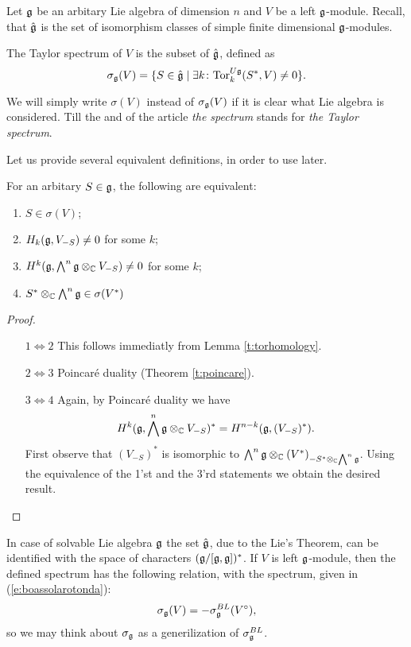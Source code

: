 Let $\mathfrak{g}$ be an arbitary Lie algebra of dimension $n$ and $V$ be a left $\mathfrak{g}$-module.  Recall, that $\hat{\mathfrak{g}}$
is the set of isomorphism classes of simple finite dimensional $\mathfrak{g}$-modules.
\begin{definition}
    The Taylor spectrum of $V$ is the subset of $\hat{\mathfrak{g}}$, defined as
    \[
        \sigma_{\mathfrak{g}}(V)=\{ S\in \hat{\mathfrak{g}} \mid \exists 
            k \colon \mathrm{Tor}^{U\mathfrak{g}}_k(S^*,V)\neq 0\}.
    \]
\end{definition}
We will simply write $\sigma(V)$ instead of $\sigma_{\mathfrak{g}}(V)$ if it is clear what Lie algebra is
considered. Till the and of the article \emph{the spectrum} stands for \emph{the Taylor spectrum}.

Let us provide several equivalent definitions, in order to use later.
\begin{lemma} \label{l:definitions}
   For an arbitary $S\in\mathfrak{g}$, the following are equivalent:
   \begin{enumerate}
       \item $S \in \sigma(V)$; 
           
       \item $H_k(\mathfrak{g}, V_{-S}) \ne 0$ for some $k$; 

       \item $H^k(\mathfrak{g}, \bigwedge^n\mathfrak{g}\otimes_{\mathbb{C}} V_{-S}) \ne 0$ for some $k$;

       \item $S^* \otimes_{\mathbb{C}} \bigwedge^n\mathfrak{g} \in \sigma(V^*)$
   \end{enumerate}
\end{lemma}
\begin{proof}
    \begin{itemize}
        \item[$1 \Leftrightarrow 2$]
            This follows immediatly from Lemma \ref{t:torhomology}.

        \item[$2 \Leftrightarrow 3$]
            Poincar\'e duality (Theorem \ref{t:poincare}).

        \item[$3 \Leftrightarrow 4$]
            Again, by Poincar\'e duality we have
            \[
                H^k(\mathfrak{g}, \bigwedge^n\mathfrak{g} \otimes_{\mathbb{C}} V_{-S})^* = H^{n - k} (\mathfrak{g}, (V_{-S})^*).
            \]
            First observe that $(V_{-S})^*$ is isomorphic to $\bigwedge^n\mathfrak{g} \otimes_{\mathbb{C}}
            (V^*)_{-S^* \otimes_{\mathbb{C}} \bigwedge^n\mathfrak{g}}$. Using the equivalence of the 1'st and the
            3'rd statements we obtain the desired result. 
    \end{itemize}
\end{proof}
    In case of solvable Lie algebra $\mathfrak{g}$ the set $\hat{\mathfrak{g}}$, due to the Lie's Theorem, can be
    identified with the space of characters $(\mathfrak{g}/[\mathfrak{g}, \mathfrak{g}])^*$. If $V$ is left
    $\mathfrak{g}$-module, then the defined spectrum has the following relation, with the spectrum, given
    in (\ref{e:boassolarotonda}):
    \[
        \sigma_{\mathfrak{g}}(V) = -\sigma^{BL}_{\mathfrak{g}}(V^\circ),
    \]
    so we may think about $\sigma_{\mathfrak{g}}$ as a generilization of $\sigma^{BL}_{\mathfrak{g}}$.
